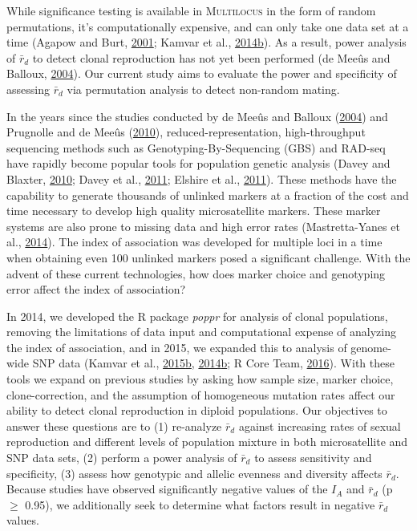 \documentclass[double,12pt]{beavtex}
\begin{document}
  While significance testing is available in \textsc{Multilocus} in the
  form of random permutations, it's computationally expensive, and can
  only take one data set at a time (Agapow and Burt,
  \protect\hyperlink{ref-Agapow_2001}{2001}; Kamvar et al.,
  \protect\hyperlink{ref-kamvar2014poppr}{2014}\protect\hyperlink{ref-kamvar2014poppr}{b}).
  As a result, power analysis of \(\bar{r}_d\) to detect clonal
  reproduction has not yet been performed (de Meeûs and Balloux,
  \protect\hyperlink{ref-de2004clonal}{2004}). Our current study aims to
  evaluate the power and specificity of assessing \(\bar{r}_d\) via
  permutation analysis to detect non-random mating.
  
  In the years since the studies conducted by de Meeûs and Balloux
  (\protect\hyperlink{ref-de2004clonal}{2004}) and Prugnolle and de Meeûs
  (\protect\hyperlink{ref-prugnolle2010apparent}{2010}),
  reduced-representation, high-throughput sequencing methods such as
  Genotyping-By-Sequencing (GBS) and RAD-seq have rapidly become popular
  tools for population genetic analysis (Davey and Blaxter,
  \protect\hyperlink{ref-davey2010rad}{2010}; Davey et al.,
  \protect\hyperlink{ref-davey2011genome}{2011}; Elshire et al.,
  \protect\hyperlink{ref-elshire2011robust}{2011}). These methods have the
  capability to generate thousands of unlinked markers at a fraction of
  the cost and time necessary to develop high quality microsatellite
  markers. These marker systems are also prone to missing data and high
  error rates (Mastretta-Yanes et al.,
  \protect\hyperlink{ref-mastretta2015restriction}{2014}). The index of
  association was developed for multiple loci in a time when obtaining
  even 100 unlinked markers posed a significant challenge. With the advent
  of these current technologies, how does marker choice and genotyping
  error affect the index of association?
  
  In 2014, we developed the R package \emph{poppr} for analysis of clonal
  populations, removing the limitations of data input and computational
  expense of analyzing the index of association, and in 2015, we expanded
  this to analysis of genome- wide SNP data (Kamvar et al.,
  \protect\hyperlink{ref-kamvar2015novel}{2015}\protect\hyperlink{ref-kamvar2015novel}{b},
  \protect\hyperlink{ref-kamvar2014poppr}{2014}\protect\hyperlink{ref-kamvar2014poppr}{b};
  R Core Team, \protect\hyperlink{ref-R2016}{2016}). With these tools we
  expand on previous studies by asking how sample size, marker choice,
  clone-correction, and the assumption of homogeneous mutation rates
  affect our ability to detect clonal reproduction in diploid populations.
  Our objectives to answer these questions are to (1) re-analyze
  \(\bar{r}_d\) against increasing rates of sexual reproduction and
  different levels of population mixture in both microsatellite and SNP
  data sets, (2) perform a power analysis of \(\bar{r}_d\) to assess
  sensitivity and specificity, (3) assess how genotypic and allelic
  evenness and diversity affects \(\bar{r}_d\). Because studies have
  observed significantly negative values of the \(I_A\) and \(\bar{r}_d\)
  (p \(\geq\) 0.95), we additionally seek to determine what factors result
  in negative \(\bar{r}_d\) values.
  
\end{document}
